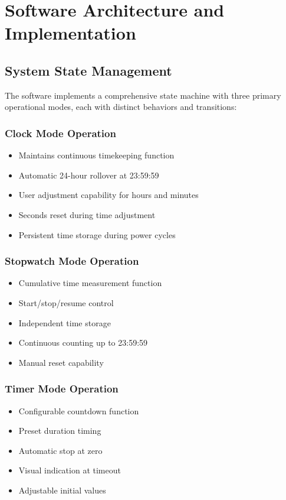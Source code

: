 \documentclass[a4paper,12pt]{article}
\begin{document}
\section{Software Architecture and Implementation}

\subsection{System State Management}
The software implements a comprehensive state machine with three primary operational modes, each with distinct behaviors and transitions:

\subsubsection{Clock Mode Operation}
\begin{itemize}
    \item Maintains continuous timekeeping function
    \item Automatic 24-hour rollover at 23:59:59
    \item User adjustment capability for hours and minutes
    \item Seconds reset during time adjustment
    \item Persistent time storage during power cycles
\end{itemize}

\subsubsection{Stopwatch Mode Operation}
\begin{itemize}
    \item Cumulative time measurement function
    \item Start/stop/resume control
    \item Independent time storage
    \item Continuous counting up to 23:59:59
    \item Manual reset capability
\end{itemize}

\subsubsection{Timer Mode Operation}
\begin{itemize}
    \item Configurable countdown function
    \item Preset duration timing
    \item Automatic stop at zero
    \item Visual indication at timeout
    \item Adjustable initial values
\end{itemize}
\end{document}
